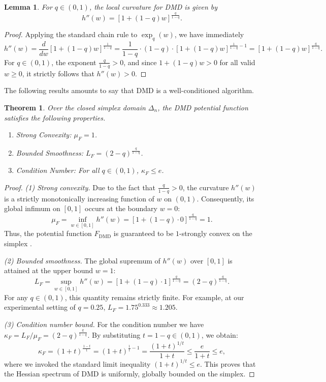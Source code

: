 \documentclass[10pt]{amsart}
\newtheorem{theorem}{Theorem}
\newtheorem{lemma}{Lemma}
\theoremstyle{definition}
\theoremstyle{definition}	 %
\begin{document}
\begin{lemma}\label{lem:DMD_curve}%
For $q \in (0,1)$, the local curvature for DMD is given by
\begin{equation}
    h''(w) = [1 + (1-q)w]^{\frac{q}{1-q}}.
\end{equation}
\end{lemma}
\begin{proof}%
Applying the standard chain rule to $\exp_q(w)$, we have immediately
\[
h''(w) = \frac{d}{dw} [1+(1-q)w]^{\frac{1}{1-q}} = \frac{1}{1-q} \cdot (1-q) \cdot [1+(1-q)w]^{\frac{1}{1-q}-1} = [1+(1-q)w]^{\frac{q}{1-q}}.
\]
For $q \in (0,1)$, the exponent $\frac{q}{1-q} > 0$, and since $1+(1-q)w > 0$ for all valid $w \geq 0$, it strictly follows that $h''(w) > 0$.
\end{proof}
The following results amounts to say that DMD is a well-conditioned algorithm.
\begin{theorem} \label{thm:DMD_wellcond}
Over the closed simplex domain $\Delta_n$, the DMD potential function satisfies the following properties.
\begin{enumerate}
    \item Strong Convexity: $\mu_F = 1$.
    \item Bounded Smoothness: $L_F = (2-q)^{\frac{q}{1-q}}$.
    \item Condition Number: For all $q \in (0, 1)$, $\kappa_F \le e$.
\end{enumerate}
\end{theorem}
\begin{proof}
\textit{(1) Strong convexity.} Due to the fact that $\frac{q}{1-q}>0$, the curvature $h''(w)$ is a strictly monotonically increasing function of $w$ on $(0,1)$. Consequently, its global infimum on $[0,1]$ occurs at the boundary $w=0$:
\[
\mu_F = \inf_{w \in[0,1]} h''(w) = [1+(1-q)\cdot 0]^{\frac{q}{1-q}} = 1.
\]
Thus, the potential function $F_{\text{DMD}}$ is  guaranteed to be $1$-strongly convex on the simplex \cite{BauschkeBorwein1997}.

\textit{(2) Bounded smoothness.} The global supremum of $h''(w)$ over $[0,1]$ is attained at the upper bound $w=1$:
\[
L_F = \sup_{w \in[0,1]} h''(w) = [1+(1-q)\cdot 1]^{\frac{q}{1-q}} = (2-q)^{\frac{q}{1-q}}.
\]
For any $q\in(0,1)$, this quantity remains strictly finite. For example, at our experimental setting of $q=0.25$, $L_F = 1.75^{0.333} \approx 1.205.$

\textit{(3) Condition number bound.} For the condition number we have $\kappa_F = L_F/\mu_F = (2-q)^{\frac{q}{1-q}}$. By substituting $t = 1-q \in (0,1)$, we obtain:
\[
\kappa_F = (1+t)^{\frac{1-t}{t}} = (1+t)^{\frac{1}{t}-1} = \frac{(1+t)^{1/t}}{1+t} \le \frac{e}{1+t} \le e,
\]
where we invoked the standard limit inequality $(1+t)^{1/t} \le e$. This  proves that the Hessian spectrum of DMD is uniformly, globally bounded on the simplex.
\end{proof}
\end{document}

